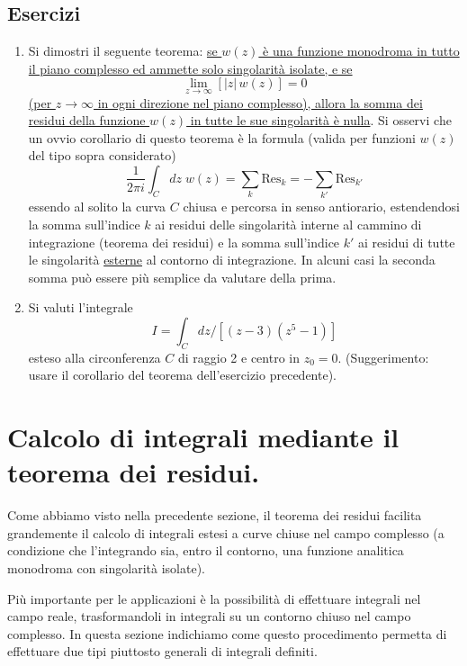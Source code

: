 \documentclass[11pt, a4paper]{book}
\numberwithin{equation}{section}
\newenvironment{esercizi}{\subsection*{Esercizi}\begin{enumerate}}{\end{enumerate}}
\begin{document}
\begin{esercizi}
\item Si dimostri il seguente teorema: \uline{se $w(z)$ è una funzione monodroma in tutto il piano complesso ed ammette solo singolarità isolate, e se}
\[
\lim_{z \to \infty}\left[|z|\,w(z)\right] = 0
\]
\uline{(per $z \to \infty$ in ogni direzione nel piano complesso), allora la somma dei residui della funzione $w(z)$ in tutte le sue singolarità è nulla}.
Si osservi che un ovvio corollario di questo teorema è la formula (valida per funzioni $w(z)$ del tipo sopra considerato)
\[
\frac{1}{2\pi i}\int_C dz\; w(z) = \sum_k \mathrm{Res}_k = -\sum_{k'} \mathrm{Res}_{k'}
\]
essendo al solito la curva $C$ chiusa e percorsa in senso antiorario, estendendosi la somma sull'indice $k$ ai residui delle singolarità interne al cammino di integrazione (teorema dei residui) e la somma sull'indice $k'$%
ai residui di tutte le singolarità \underline{esterne} al contorno di integrazione. In alcuni casi la seconda somma può essere più semplice da valutare della prima.

\item Si valuti l'integrale
\[
I = \int_C dz \Big/ \left[(z-3)(z^5-1)\right]
\]
esteso alla circonferenza $C$ di raggio 2 e centro in $z_0 = 0$. (Suggerimento: usare il corollario del teorema dell'esercizio precedente).
\end{esercizi}

\section{Calcolo di integrali mediante il teorema dei residui.}

Come abbiamo visto nella precedente sezione, il teorema dei residui facilita grandemente il calcolo di integrali estesi a curve chiuse nel campo complesso (a condizione che l'integrando sia, entro il contorno, una funzione analitica monodroma con singolarità isolate).

Più importante per le applicazioni è la possibilità di effettuare integrali nel campo reale, trasformandoli in integrali su un contorno chiuso nel campo complesso. In questa sezione indichiamo come questo procedimento permetta di effettuare due tipi piuttosto generali di integrali definiti.
\end{document}

